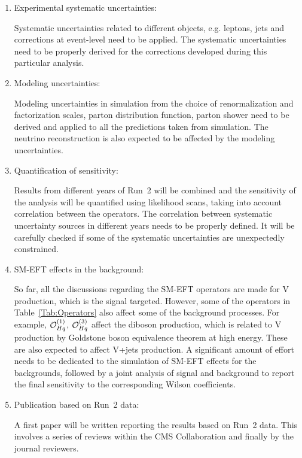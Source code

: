 \documentclass[a4paper,11pt]{article}
\renewcommand{\PV}{{{{V}}}\xspace}
\newcommand{\VH}{{{\PV}{\PH}}\xspace}
\begin{document}
\begin{enumerate}
\item Experimental systematic uncertainties: 

Systematic uncertainties related to different objects, e.g. leptons, jets and corrections at event-level need to be applied. The systematic uncertainties need to be properly derived for the corrections developed during this particular analysis. 

\item Modeling uncertainties: 

Modeling uncertainties in simulation from the choice of renormalization and factorization scales, parton distribution function, parton shower need to be derived and applied to all the predictions taken from simulation. 
The neutrino reconstruction is also expected to be affected by the modeling uncertainties. 

\item Quantification of sensitivity: 

Results from different years of Run~2 will be combined and
the sensitivity of the analysis will be quantified using likelihood scans, taking into account correlation between the operators. 
The correlation between systematic uncertainty sources in different years needs to be properly defined. 
It will be carefully checked if some of the systematic uncertainties are unexpectedly constrained. 

\item SM-EFT effects in the background:

So far, all the discussions regarding the SM-EFT operators are made for \VH production, which is the signal targeted. However, some of the operators in Table~\ref{Tab:Operators} also affect some of the background processes. 
For example, ${\cal O}^{(1)}_{Hq}$, ${\cal O}^{(3)}_{Hq}$ affect the diboson production, which is related to \VH production by Goldstone boson equivalence theorem at high energy. 
These are also expected to affect {\PV}+jets production. 
A significant amount of effort needs to be dedicated to the simulation of SM-EFT effects for the backgrounds, followed by a joint analysis of signal and background to report the final sensitivity to the corresponding Wilson coefficients. 

\item Publication based on Run~2 data:

A first paper will be written reporting the results based on Run~2 data. This involves a series of reviews within the CMS Collaboration and finally by the journal reviewers. 


\end{enumerate}
\end{document}
